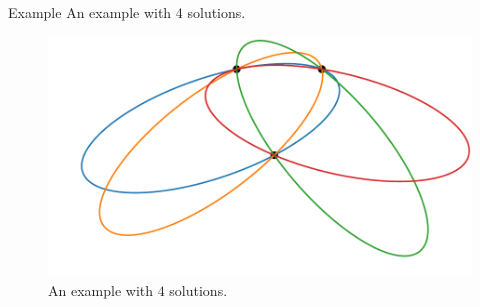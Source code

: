 \documentclass{beamer}
\begin{document}
\begin{frame}{Example}
	An example with $4$ solutions.
	\begin{figure}
		\centering
		
		\includegraphics[scale=.6]{e3psol012}
		\caption{An example with $4$ solutions.}
	\end{figure}
\end{frame}

	
\end{document}

